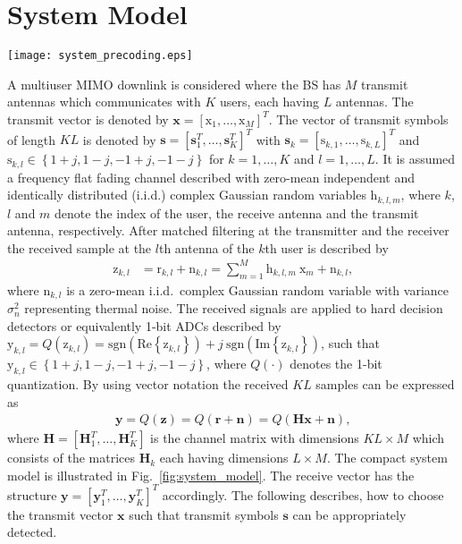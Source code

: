 \documentclass[journal,comsoc]{IEEEtran}
\begin{document}
\section{System Model}
\label{sec:system_model}
\begin{figure*}[h]
\begin{center}
\captionsetup{justification=centering}
\texttt{[image: system\_precoding.eps]}
\caption{MIMO system model}
\label{fig:system_model}       %
\vspace{-0.75em}
\end{center}
\end{figure*}
A multiuser MIMO downlink is considered where the BS has $M$ transmit antennas which communicates with $K$ users, each having $L$ antennas.
The transmit vector is denoted by $\mathbf{x}=[\mathrm{x}_1,\ldots,\mathrm{x}_M]^T$.
The vector of transmit symbols of length $K L$ is denoted by $\mathbf{s}=[\mathbf{s}_1^T,\ldots,\mathbf{s}_K^T]^T$ with $\mathbf{s}_k=[\mathrm{s}_{k,1},\ldots,\mathrm{s}_{k,L}]^T$ and $\mathrm{s}_{k,l} \in \left\{  1+j,1-j,-1+j,-1-j  \right\}$ for $k=1,\ldots,K$ and $l=1,\ldots,L$. It is assumed a frequency flat fading channel described with zero-mean independent and identically distributed (i.i.d.) complex Gaussian random variables $\mathrm{h}_{k,l,m}$, where $k$, $l$ and $m$ denote the index of the user, the receive antenna and the transmit antenna, respectively.
After matched filtering at the transmitter and the receiver the received sample at the $l$th antenna of the $k$th user is described by 
\begin{align}
\label{eq:received_sample}
\mathrm{z}_{k,l} & =  \mathrm{r}_{k,l} +  \mathrm{n}_{k,l}  = \sum_{m=1}^{M}     \mathrm{h}_{k,l,m } \ \mathrm{x}_m + \mathrm{n}_{k,l} \textrm{,}
\end{align}
where $\mathrm{n}_{k,l}$ is a zero-mean i.i.d.\ complex Gaussian random variable with variance $\sigma_n^2$ representing thermal noise.
The received signals are applied to hard decision detectors or equivalently 1-bit ADCs described by $\mathrm{y}_{k,l}=Q(\mathrm{z}_{k,l})= \mathrm{sgn}(\mathrm{Re}\left\{\mathrm{z}_{k,l}\right\}) +j \ \mathrm{sgn}(\mathrm{Im}\left\{\mathrm{z}_{k,l}\right\})$, such that ${\mathrm{y}}_{k,l} \in \left\{ 1+j,1-j,-1+j,-1-j \right\}$, where $Q(\cdot)$ denotes the 1-bit quantization. 
By using vector notation the received $K L$ samples can be expressed as
\begin{align}
\mathbf{y}=Q(\mathbf{z})= Q(\mathbf{r} + \mathbf{n}) =Q(  \mathbf{H} \mathbf{x} + \mathbf{n}) \textrm{,}
\end{align}
where $\mathbf{H}=[\mathbf{H}_1^T,\ldots,\mathbf{H}_K^T]$ is the channel matrix with dimensions $K L \times M$ which consists of the matrices $\mathbf{H}_k$ each having dimensions $L \times M$. The compact system model is illustrated in Fig.~\ref{fig:system_model}.       
The receive vector has the structure $\mathbf{y}=[\mathbf{y}_1^T,\ldots,\mathbf{y}_K^T]^T$ accordingly. 
The following describes, how to choose the transmit vector $\mathbf{x}$ such that transmit symbols $\mathbf{s}$ can be appropriately detected.
 
\end{document}
